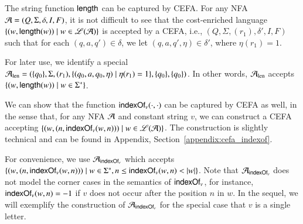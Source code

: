 \begin{example}\label{exm:len}
The string function $\mathsf{length}$ can be captured by CEFA. For any NFA $\mathcal{A}=(Q, \Sigma,  \delta, I, F)$, it is not difficult to see that the cost-enriched language $\{(w, \mathsf{length}(w)) \mid w\in \mathscr{L}(\mathcal{A})\}$ is accepted by a CEFA, i.e., 
$(Q, \Sigma, (r_1), \delta', I, F)$  %
such that for each $(q, a, q')\in \delta$, we let $(q, a, q', \eta)\in \delta'$, where $\eta(r_1) = 1$. 

For later use, we identify a special $\mathcal{A}_{\rm len}= (\{q_0\}, \Sigma, (r_1), \{(q_0, a, q_0, \eta) \mid \eta(r_1) = 1\}, \{q_0\}, \{q_0\})$. In other words, $\mathcal{A}_{\rm len}$ accepts $\{(w, \mathsf{length}(w)) \mid w\in \Sigma^*\}$.
%
%
\end{example}

We can show that the function $\mathsf{indexOf}_v(\cdot, \cdot)$ can be captured by CEFA as well, in the sense that, for any NFA $\mathcal{A}$ and constant string $v$, we can construct a CEFA %
accepting $\{(w, (n, \mathsf{indexOf}_v(w, n)))\mid w\in \mathscr{L}(\mathcal{A}) \}$. %
The construction is slightly technical and can be found in Appendix, Section~\ref{appendix:cefa_indexof}.

For convenience, we use $\mathcal{A}_{\mathsf{indexOf}_v}$ which accepts $\{(w, (n, \mathsf{indexOf}_v(w, n)))\mid w\in \Sigma^*, n \le \mathsf{indexOf}_v(w, n) < |w| \}$. %
Note that $\mathcal{A}_{\mathsf{indexOf}_v}$ does not model the corner cases in the semantics of $\mathsf{indexOf}_v$, for instance, $\mathsf{indexOf}_v(w, n) = -1$ if $v$ does not occur after the position $n$ in $w$.
In the sequel, we will exemplify the construction of $\mathcal{A}_{\mathsf{indexOf}_v}$ for the special case that $v$ is a single letter.  

